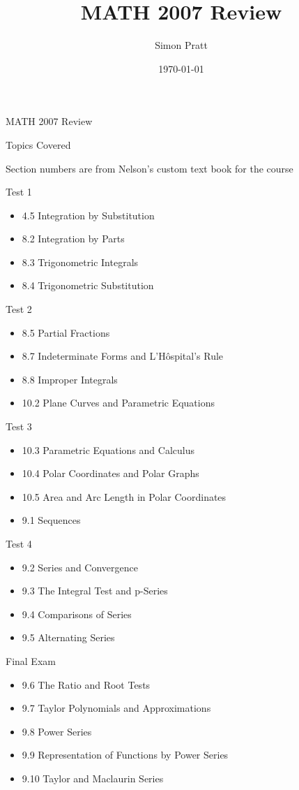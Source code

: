 \documentclass{article}
\title{MATH 2007 Review}
\author{Simon Pratt}
\date{\today}
\begin{document}
{\Huge MATH 2007 Review}

\vspace{1 cm}

{\huge Topics Covered}

{\tiny *Section numbers are from Nelson's custom text book for the course}

Test 1
\begin{itemize}
\item 4.5 Integration by Substitution
\item 8.2 Integration by Parts
\item 8.3 Trigonometric Integrals
\item 8.4 Trigonometric Substitution
\end{itemize}

Test 2
\begin{itemize}
\item 8.5 Partial Fractions
\item 8.7 Indeterminate Forms and L'H\^{o}spital's Rule
\item 8.8 Improper Integrals
\item 10.2 Plane Curves and Parametric Equations
\end{itemize}

Test 3
\begin{itemize}
\item 10.3 Parametric Equations and Calculus
\item 10.4 Polar Coordinates and Polar Graphs
\item 10.5 Area and Arc Length in Polar Coordinates
\item 9.1 Sequences
\end{itemize}

Test 4
\begin{itemize}
\item 9.2 Series and Convergence
\item 9.3 The Integral Test and p-Series
\item 9.4 Comparisons of Series
\item 9.5 Alternating Series
\end{itemize}

Final Exam
\begin{itemize}
\item 9.6 The Ratio and Root Tests
\item 9.7 Taylor Polynomials and Approximations
\item 9.8 Power Series
\item 9.9 Representation of Functions by Power Series
\item 9.10 Taylor and Maclaurin Series
\end{itemize}
\end{document}
